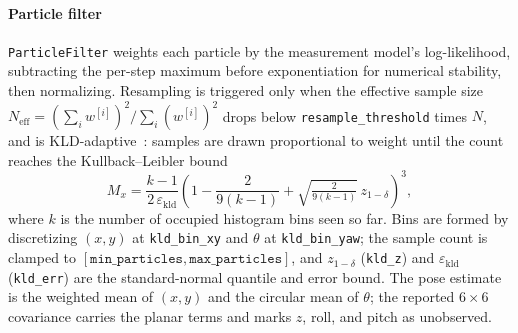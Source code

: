 \paragraph{Particle filter} \texttt{ParticleFilter} weights each particle by the
measurement model's log-likelihood, subtracting the per-step maximum before
exponentiation for numerical stability, then normalizing. Resampling is
triggered only when the effective sample size
$N_\mathrm{eff} = (\sum_i w^{[i]})^2 / \sum_i (w^{[i]})^2$ drops below
\texttt{resample\_threshold} times $N$, and is KLD-adaptive~\cite{fox2003kld}:
samples are drawn proportional to weight until the count reaches the
Kullback--Leibler bound
\begin{equation}
M_x = \frac{k-1}{2\,\varepsilon_\mathrm{kld}}
      \left(1 - \frac{2}{9(k-1)} + \sqrt{\tfrac{2}{9(k-1)}}\,z_{1-\delta}\right)^{3},
\end{equation}
where $k$ is the number of occupied histogram bins seen so far. Bins are formed
by discretizing $(x,y)$ at \texttt{kld\_bin\_xy} and $\theta$ at
\texttt{kld\_bin\_yaw}; the sample count is clamped to
$[\texttt{min\_particles}, \texttt{max\_particles}]$, and $z_{1-\delta}$
(\texttt{kld\_z}) and $\varepsilon_\mathrm{kld}$ (\texttt{kld\_err}) are the
standard-normal quantile and error bound. The pose estimate is the weighted mean
of $(x,y)$ and the circular mean of $\theta$; the reported $6\times6$ covariance
carries the planar terms and marks $z$, roll, and pitch as unobserved.

